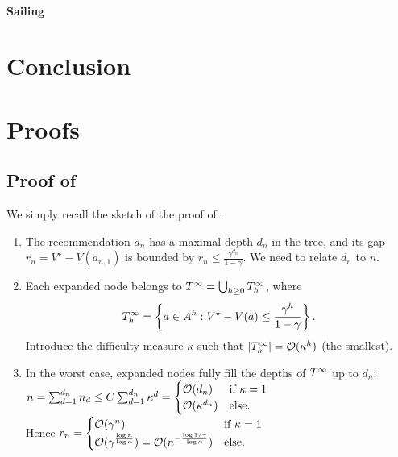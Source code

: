 \documentclass[runningheads]{llncs}
\begin{document}
\paragraph{Sailing}

\section*{Conclusion}





\clearpage
\appendix

\section{Proofs}
\subsection{Proof of }
We simply recall the sketch of the proof of \citet{hren2008optimistic}.\\

\begin{enumerate}
	\item The recommendation $a_n$ has a maximal depth $d_n$ in the tree, and its gap $r_n = V^\star - V({a_{n,1}})$ is bounded by $r_n \leq \frac{\gamma^{d_n}}{1-\gamma}$. We need to relate $d_n$ to $n$.
	
	\item Each expanded node belongs to $T^\infty = \bigcup_{h\geq 0} T_h^\infty$, where $$T_h^\infty = \left\{a\in A^h: V^\star-V(a) \leq \frac{\gamma^h}{1-\gamma}\right\}.$$ Introduce the difficulty measure $\kappa$ such that $|T_h^\infty| = \mathcal{O}(\kappa^h)$ (the smallest).
	
	\item In the worst case, expanded nodes fully fill the depths of $T^\infty$ up to $d_n$: $n = \sum_{d=1}^{d_n} n_d \leq  C\sum_{d=1}^{d_n} \kappa^d = \begin{cases}
	\mathcal{O}(d_n) &\text{if $\kappa=1$}\\
	\mathcal{O}(\kappa^{d_n}) &\text{else.}
	\end{cases}$\\
	Hence $r_n = \begin{cases}
	\mathcal{O}(\gamma^n) &\text{if $\kappa=1$}\\
	\mathcal{O}(\gamma^{\frac{\log n}{\log \kappa}}) = \mathcal{O}(n^{-\frac{\log 1/\gamma}{\log \kappa}}) &\text{else.}
	\end{cases}$
\end{enumerate}
\end{document}
